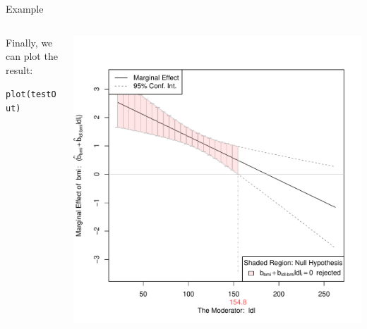 \documentclass{beamer}\usepackage[]{graphicx}\usepackage[]{color}
\makeatletter
\def\maxwidth{ %
  \ifdim\Gin@nat@width>\linewidth
    \linewidth
  \else
    \Gin@nat@width
  \fi
}
\newcommand{\hlstd}[1]{\textcolor[rgb]{0,0,0}{#1}}%
\newcommand{\hlkwd}[1]{\textcolor[rgb]{0.004,0.004,0.506}{#1}}%
\newenvironment{kframe}{%
 \def\at@end@of@kframe{}%
 \ifinner\ifhmode%
  \def\at@end@of@kframe{\end{minipage}}%
  \begin{minipage}{\columnwidth}%
 \fi\fi%
 \def\FrameCommand##1{\hskip\@totalleftmargin \hskip-\fboxsep
 \colorbox{shadecolor}{##1}\hskip-\fboxsep
     \hskip-\linewidth \hskip-\@totalleftmargin \hskip\columnwidth}%
 \MakeFramed {\advance\hsize-\width
   \@totalleftmargin\z@ \linewidth\hsize
   \@setminipage}}%
 {\par\unskip\endMakeFramed%
 \at@end@of@kframe}
\newenvironment{knitrout}{}{} %
\makeatother
\begin{document}
\begin{frame}[fragile]{Example}

  \begin{columns}
    \begin{column}{0.35\textwidth}
      
      Finally, we can plot the result:
      
\begin{knitrout}\footnotesize
{}\color{fgcolor}\begin{kframe}
\begin{alltt}
\hlkwd{plot}\hlstd{(testOut)}
\end{alltt}
\end{kframe}
\end{knitrout}

\end{column}
\begin{column}{0.65\textwidth}
  


{\centering \includegraphics[width=\maxwidth]{figure/unnamed-chunk-18-1} 

}




\end{column}
\end{columns}

\end{frame}
\end{document}
